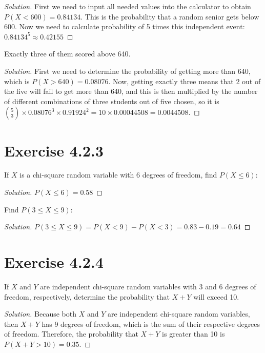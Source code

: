 \documentclass[titlepage, letterpaper, fleqn]{article}
\newcommand{\spacepls}{\vspace{5mm}}
\renewcommand\qedsymbol{\(\blacksquare\)}
\newenvironment{solution}
{\renewcommand\qedsymbol{$\square$}\begin{proof}[Solution]}
{\end{proof}}
\begin{document}
\begin{solution}
First we need to input all needed values into the calculator to obtain $P(X < 600) = 0.84134$.
This is the probability that a random senior gets below 600. Now we need to calculate probability of 5 times this independent event: $0.84134^5 \approx 0.42155$
\end{solution}

\spacepls

{\large Exactly three of them scored above 640.}

\begin{solution}
First we need to determine the probability of getting more than 640, which is $P(X>640) = 0.08076$.
Now, getting exactly three means that 2 out of the five will fail to get more than 640,
and this is then multiplied by the number of different combinations of three students out of five chosen,
so it is $\binom{5}{3} \times 0.08076^3 \times 0.91924^2 = 10 \times 0.00044508 = 0.0044508$.
\end{solution}

\spacepls

\section{Exercise 4.2.3}

{\large If $X$ is a chi-square random variable with 6 degrees of freedom, find $P(X \leq 6)$:}

\begin{solution}
$P(X \leq 6) = 0.58$
\end{solution}

\spacepls

{\large Find $P(3 \leq X \leq 9)$:}

\begin{solution}
$P(3 \leq X \leq 9) = P(X < 9) - P(X < 3) = 0.83 - 0.19 = 0.64$
\end{solution}

\spacepls

\section{Exercise 4.2.4}

{\large If $X$ and $Y$ are independent chi-square random variables with 3 and 6 degrees of freedom, respectively, determine the probability that $X + Y$ will exceed 10.}

\begin{solution}
Because both $X$ and $Y$ are independent chi-square random variables, then $X+Y$ has 9 degrees of freedom,
which is the sum of their respective degrees of freedom.
Therefore, the probability that $X+Y$ is greater than 10 is $P(X+Y > 10) =0.35$.
\end{solution}
\end{document}

